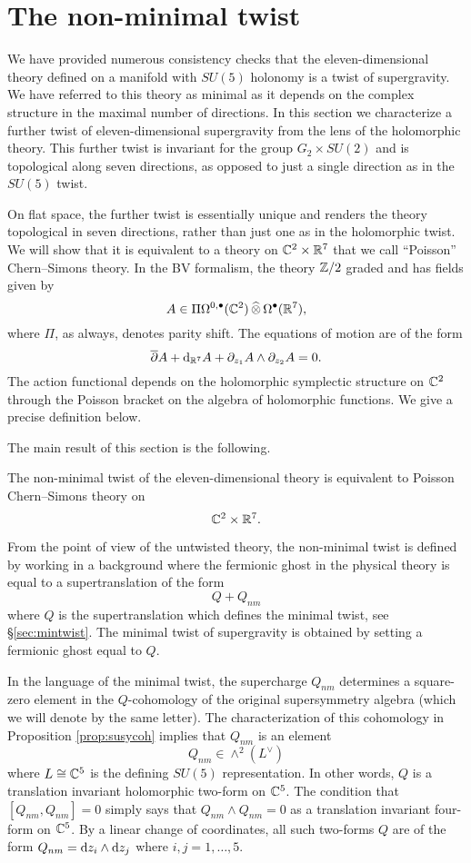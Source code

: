 \section{The non-minimal twist}\label{s:nonmin}

We have provided numerous consistency checks that the eleven-dimensional theory defined on a manifold with $SU(5)$ holonomy is a twist of supergravity. 
We have referred to this theory as minimal as it depends on the complex structure in the maximal number of directions. 
In this section we characterize a further twist of eleven-dimensional supergravity from the lens of the holomorphic theory.  
This further twist is invariant for the group $G_2 \times SU(2)$ and is topological along seven directions, as opposed to just a single direction as in the $SU(5)$ twist. 

On flat space, the further twist is essentially unique and renders the theory topological in seven directions, rather than just one as in the holomorphic twist. 
We will show that it is equivalent to a theory on $\mathbb C^2 \times \mathbb R^7$ that we call ``Poisson'' Chern--Simons theory. 
In the BV formalism, the theory $\mathbb Z/2$ graded and has fields given by
\[
A \in \Pi \Omega^{0,\bullet}(\mathbb C^2) \, \widehat{\otimes} \, \Omega^\bullet(\mathbb R^7) ,
\]
where $\Pi$, as always, denotes parity shift.
The equations of motion are of the form
\[
\overline{\partial} A + {\rm d}_{\mathbb R^7} A + \partial_{z_1} A \wedge \partial_{z_2} A = 0 .
\]
The action functional depends on the holomorphic symplectic structure on $\mathbb C^2$ through the Poisson bracket on the algebra of holomorphic functions.
We give a precise definition below. 

The main result of this section is the following.

\begin{thm}
\label{thm:nonmin}
The non-minimal twist of the eleven-dimensional theory is equivalent to Poisson Chern--Simons theory on 
\[
\mathbb C^2 \times \mathbb R^7 .
\]
\end{thm}

From the point of view of the untwisted theory, the non-minimal twist is defined by working in a background where the fermionic ghost in the physical theory is equal to a supertranslation of the form
\[
Q + Q_{nm} 
\]
where $Q$ is the supertranslation which defines the minimal twist, see \S \ref{sec:mintwist}.
The minimal twist of supergravity is obtained by setting a fermionic ghost equal to $Q$. 

In the language of the minimal twist, the supercharge $Q_{nm}$ determines a square-zero element in the $Q$-cohomology of the original supersymmetry algebra (which we will denote by the same letter). 
The characterization of this cohomology in Proposition \ref{prop:susycoh} implies that $Q_{nm}$ is an element 
\[
Q_{nm} \in \wedge^2 \left(L^\vee\right)
\]
where $L \cong \mathbb C^5$ is the defining $SU(5)$ representation. 
In other words, $Q$ is a translation invariant holomorphic two-form on $\mathbb C^5$. 
The condition that $[Q_{nm}, Q_{nm}] = 0$ simply says that $Q_{nm}\wedge Q_{nm} = 0$ as a translation invariant four-form on $\mathbb C^5$. 
By a linear change of coordinates, all such two-forms $Q$ are of the form $Q_{nm} = {\rm d} z_i \wedge {\rm d} z_j$ where $i,j=1,\ldots, 5$.


